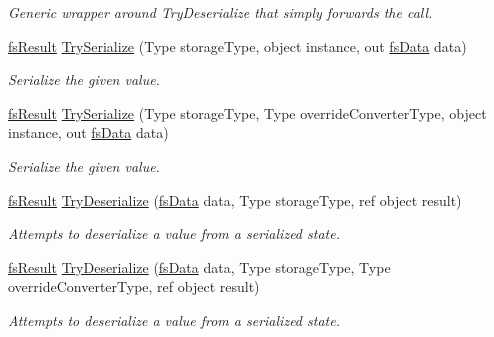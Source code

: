 \begin{DoxyCompactItemize}
\begin{DoxyCompactList}\small\item\em Generic wrapper around Try\+Deserialize that simply forwards the call. \end{DoxyCompactList}\item 
\hyperlink{struct_full_serializer_1_1fs_result}{fs\+Result} \hyperlink{class_full_serializer_1_1fs_serializer_a17e5574115d10ded25ac40d46eeae4f2}{Try\+Serialize} (Type storage\+Type, object instance, out \hyperlink{class_full_serializer_1_1fs_data}{fs\+Data} data)
\begin{DoxyCompactList}\small\item\em Serialize the given value. \end{DoxyCompactList}\item 
\hyperlink{struct_full_serializer_1_1fs_result}{fs\+Result} \hyperlink{class_full_serializer_1_1fs_serializer_a02eb0a2533b600eada768fcbaba86d63}{Try\+Serialize} (Type storage\+Type, Type override\+Converter\+Type, object instance, out \hyperlink{class_full_serializer_1_1fs_data}{fs\+Data} data)
\begin{DoxyCompactList}\small\item\em Serialize the given value. \end{DoxyCompactList}\item 
\hyperlink{struct_full_serializer_1_1fs_result}{fs\+Result} \hyperlink{class_full_serializer_1_1fs_serializer_a9ada1781fcc582b65d809815fe2c24e9}{Try\+Deserialize} (\hyperlink{class_full_serializer_1_1fs_data}{fs\+Data} data, Type storage\+Type, ref object result)
\begin{DoxyCompactList}\small\item\em Attempts to deserialize a value from a serialized state. \end{DoxyCompactList}\item 
\hyperlink{struct_full_serializer_1_1fs_result}{fs\+Result} \hyperlink{class_full_serializer_1_1fs_serializer_a16a24f10dfdc70f69e2ace4f2e4d891e}{Try\+Deserialize} (\hyperlink{class_full_serializer_1_1fs_data}{fs\+Data} data, Type storage\+Type, Type override\+Converter\+Type, ref object result)
\begin{DoxyCompactList}\small\item\em Attempts to deserialize a value from a serialized state. \end{DoxyCompactList}\end{DoxyCompactItemize}
